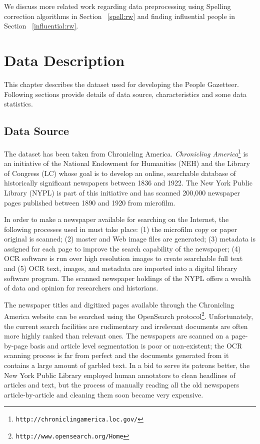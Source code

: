\documentclass[letterpaper,11pt]{report}
\begin{document}
We discuss more related work regarding data preprocessing using Spelling correction algorithms in Section ~\ref{spell:rw} and finding influential people in Section ~\ref{influential:rw}.






\chapter{Data Description}
\label{chapter:data description}

This chapter describes the dataset used for developing the People Gazetteer. Following sections provide details of data source, characteristics and some data statistics.

\section{Data Source} 

The dataset has been taken from Chronicling America.
\noindent \emph{Chronicling
America}\footnote{\texttt{http://chroniclingamerica.loc.gov/}} is an
initiative of the National Endowment for Humanities (NEH) and the
Library of Congress (LC) whose goal is to develop an online,
searchable database of historically significant newspapers between
1836 and 1922. The New York Public Library (NYPL) is part of this
initiative and has scanned 200,000 newspaper pages published between
1890 and 1920 from microfilm.

In order to make a newspaper available for searching on the Internet,
the following processes used in \cite{dutta2011learning} must take place: (1) the microfilm copy or
paper original is scanned; (2) master and Web image files are
generated; (3) metadata is assigned for each page to improve the
search capability of the newspaper; (4) OCR software is run over high
resolution images to create searchable full text and (5) OCR text,
images, and metadata are imported into a digital library software
program. The scanned newspaper holdings of the NYPL offers a wealth of
data and opinion for researchers and historians.

The newspaper titles and digitized pages available through the
Chronicling America website can be searched using the OpenSearch
protocol\footnote{\texttt{http://www.opensearch.org/Home}}.
Unfortunately, the current search facilities are rudimentary and
irrelevant documents are often more highly ranked than relevant ones.
The newspapers are scanned on a page-by-page basis and article level
segmentation is poor or non-existent; the OCR scanning process is far
from perfect and the documents generated from it contains a large
amount of garbled text. In a bid to serve its patrons better, the New
York Public Library employed human annotators to clean headlines of
articles and text, but the process of manually reading all the old
newspapers article-by-article and cleaning them soon became very
expensive. 
\end{document}
